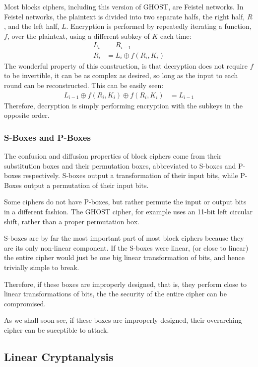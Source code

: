\documentclass[12pt, a4paper, draft]{report}
\begin{document}
Most blocks ciphers, including this version of GHOST, are Feistel networks.
In Feistel networks, the plaintext is divided into two separate halfs, the
right half, $R$, and the left half, $L$. Encryption is performed by
repeatedly iterating a function, $f$, over the plaintext, using a
different subkey of $K$ each time:
\begin{align*}
    L_i & = R_{i - 1}\\
    R_i & = L_i \oplus f(R_i, K_i)
\end{align*}
The wonderful property of this construction, is that decryption does not
require $f$ to be invertible, it can be as complex as desired, so long as
the input to each round can be reconstructed. This can be easily seen:
\begin{align*}
    L_{i - 1} \oplus f(R_i, K_i) \oplus f(R_i, K_i) & = L_{i - 1}
\end{align*}
Therefore, decryption is simply performing encryption with the subkeys in
the opposite order.

\subsubsection{S-Boxes and P-Boxes}

The confusion and diffusion properties of block ciphers come from their
substitution boxes and their permutation boxes, abbreviated to S-boxes
and P-boxes respectively. S-boxes output a transformation of their input
bits, while P-Boxes output a permutation of their input bits.

Some ciphers do not have P-boxes, but rather permute the input or output
bits in a different fashion. The GHOST cipher, for example uses an 11-bit
left circular shift, rather than a proper permutation box.

S-boxes are by far the most important part of most block ciphers because
they are its only non-linear component. If the S-boxes were linear,
(or close to linear) the entire cipher would just be one big linear
transformation of bits, and hence trivially simple to break.

Therefore, if these boxes are improperly designed, that is, they perform
close to linear transformations of bits, the the security of the entire
cipher can be compromised.

As we shall soon see, if these boxes are improperly designed, their overarching
cipher can be suceptible to attack.

\subsection{Linear Cryptanalysis}
\end{document}
